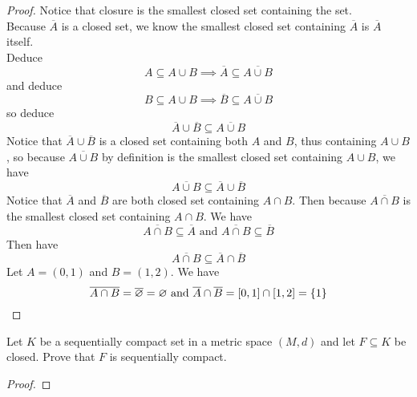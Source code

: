\documentclass{report}
\begin{document}
\begin{proof}
Notice that closure is the smallest closed set containing the set.\\

Because $\overline{A}$ is a closed set, we know the smallest closed set containing $\overline{A}$ is $\overline{A}$ itself.\\

Deduce
\begin{equation}
A\subseteq A\cup B\implies \overline{A}\subseteq \overline{A\cup B}
\end{equation}
and deduce
\begin{equation}
B\subseteq A\cup B\implies \overline{B}\subseteq \overline{A\cup B}
\end{equation}
so deduce
\begin{equation}
\overline{A}\cup \overline{B}\subseteq \overline{A\cup B}
\end{equation}
Notice that $\overline{A}\cup \overline{B}$ is a closed set containing both $A$ and  $B$, thus containing $A\cup B$, so because $\overline{A\cup B}$ by definition is the smallest closed set containing $A\cup B$, we have
\begin{equation}
\overline{A\cup B}\subseteq \overline{A}\cup \overline{B}
\end{equation}
Notice that $\overline{A}$ and $\overline{B}$ are both closed set containing $A\cap B$. Then because $\overline{A\cap B}$ is the smallest closed set containing  $A\cap B$. We have
\begin{equation}
\overline{A\cap B}\subseteq \overline{A}\text{ and }\overline{A\cap B}\subseteq \overline{B}
\end{equation}
Then have
\begin{equation}
\overline{A\cap B}\subseteq \overline{A}\cap \overline{B}
\end{equation}
Let $A=(0,1)$ and $B=(1,2)$. We have
\begin{equation}
\overline{A\cap B}=\overline{\varnothing}=\varnothing\text{ and }\overline{A}\cap \overline{B}=[0,1]\cap [1,2]=\{ 1 \}
\end{equation}
\end{proof}
\begin{question}{}{}

Let \( K \) be a sequentially compact set in a metric space \( (M, d) \) and let \( F \subseteq K \) be closed. Prove that \( F \) is sequentially compact.
\end{question}
\begin{proof}

\end{proof}
\end{document}
